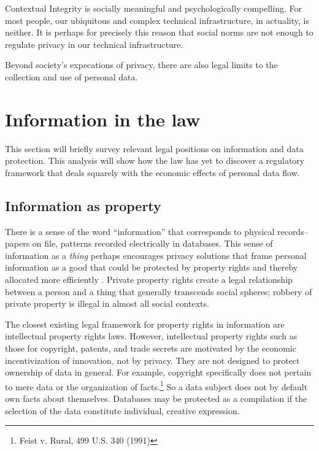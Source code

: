 \documentclass[../thesis.tex]{subfiles}
\begin{document}
Contextual Integrity is socially meaningful and
psychologically compelling.
For most people, our ubiquitous and complex
technical infrastructure, in actuality, is neither.
It is perhaps for precisely this reason that social
norms are not enough to regulate privacy in our
technical infrastructure.

Beyond society's expecations of privacy, there
are also legal limits to the collection and use
of personal data.

\section{Information in the law}
\label{sec:law}

This section will briefly survey relevant
legal positions on information and data protection.
This analysis will show how the law has yet to discover
a regulatory framework that deals squarely with
the economic effects of personal data flow.

\subsection{Information as property}

There is a sense of the word ``information'' that
corresponds to physical records--papers on file,
patterns recorded electrically in databases.
This sense of information as a \emph{thing}
\citep{buckland1991information}
perhaps encourages
privacy solutions that frame personal information as a
good that could be protected by property rights and
thereby allocated more efficiently 
\citep{murphy1995property}.
Private property rights create a legal relationship between
a person and a thing that generally transcends
social spheres; robbery of private property is illegal
in almost all social contexts.

The closest existing legal framework for property rights
in information are intellectual property rights laws.
However, intellectual property rights such as those
for copyright, patents, and trade secrets are motivated
by the economic incentivization of innovation, not
by privacy.
They are not designed to protect ownership of data
in general.
For example, copyright specifically does
not pertain to mere data or the organization
of facts.\footnote{Feist v. Rural, 499 U.S. 340 (1991)}
So a data subject does not by default own facts
about themselves.
Databases may be protected as a compilation if
the selection of the data constitute individual,
creative expression.
\end{document}
